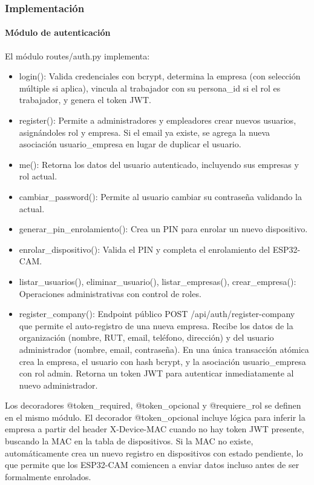 \subsubsection{Implementación}

\paragraph{Módulo de autenticación}

El módulo routes/auth.py implementa:

\begin{itemize}
    \item login(): Valida credenciales con bcrypt, determina la empresa (con selección múltiple si aplica), vincula al trabajador con su persona\_id si el rol es trabajador, y genera el token JWT.
    \item register(): Permite a administradores y empleadores crear nuevos usuarios, asignándoles rol y empresa. Si el email ya existe, se agrega la nueva asociación usuario\_empresa en lugar de duplicar el usuario.
    \item me(): Retorna los datos del usuario autenticado, incluyendo sus empresas y rol actual.
    \item cambiar\_password(): Permite al usuario cambiar su contraseña validando la actual.
    \item generar\_pin\_enrolamiento(): Crea un PIN para enrolar un nuevo dispositivo.
    \item enrolar\_dispositivo(): Valida el PIN y completa el enrolamiento del ESP32-CAM.
    \item listar\_usuarios(), eliminar\_usuario(), listar\_empresas(), crear\_empresa(): Operaciones administrativas con control de roles.
    \item register\_company(): Endpoint público POST /api/auth/register-company que permite el auto-registro de una nueva empresa. Recibe los datos de la organización (nombre, RUT, email, teléfono, dirección) y del usuario administrador (nombre, email, contraseña). En una única transacción atómica crea la empresa, el usuario con hash bcrypt, y la asociación usuario\_empresa con rol admin. Retorna un token JWT para autenticar inmediatamente al nuevo administrador.
\end{itemize}

Los decoradores @token\_required, @token\_opcional y @requiere\_rol se definen en el mismo módulo. El decorador @token\_opcional incluye lógica para inferir la empresa a partir del header X-Device-MAC cuando no hay token JWT presente, buscando la MAC en la tabla de dispositivos. Si la MAC no existe, automáticamente crea un nuevo registro en dispositivos con estado pendiente, lo que permite que los ESP32-CAM comiencen a enviar datos incluso antes de ser formalmente enrolados.

